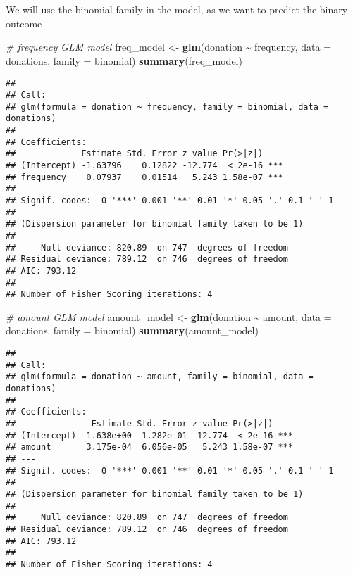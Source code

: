 \documentclass[
]{article}
\newenvironment{Shaded}{\begin{snugshade}}{\end{snugshade}}
\newcommand{\AttributeTok}[1]{\textcolor[rgb]{0.13,0.29,0.53}{#1}}
\newcommand{\CommentTok}[1]{\textcolor[rgb]{0.56,0.35,0.01}{\textit{#1}}}
\newcommand{\FunctionTok}[1]{\textcolor[rgb]{0.13,0.29,0.53}{\textbf{#1}}}
\newcommand{\NormalTok}[1]{#1}
\newcommand{\OtherTok}[1]{\textcolor[rgb]{0.56,0.35,0.01}{#1}}
\newcommand{\SpecialCharTok}[1]{\textcolor[rgb]{0.81,0.36,0.00}{\textbf{#1}}}
\begin{document}
We will use the binomial family in the model, as we want to predict the
binary outcome

\begin{Shaded}
\begin{Highlighting}[]
\CommentTok{\# frequency GLM model}
\NormalTok{freq\_model }\OtherTok{\textless{}{-}} \FunctionTok{glm}\NormalTok{(donation }\SpecialCharTok{\textasciitilde{}}\NormalTok{ frequency, }\AttributeTok{data =}\NormalTok{ donations, }\AttributeTok{family =}\NormalTok{ binomial)}
\FunctionTok{summary}\NormalTok{(freq\_model)}
\end{Highlighting}
\end{Shaded}

\begin{verbatim}
## 
## Call:
## glm(formula = donation ~ frequency, family = binomial, data = donations)
## 
## Coefficients:
##             Estimate Std. Error z value Pr(>|z|)    
## (Intercept) -1.63796    0.12822 -12.774  < 2e-16 ***
## frequency    0.07937    0.01514   5.243 1.58e-07 ***
## ---
## Signif. codes:  0 '***' 0.001 '**' 0.01 '*' 0.05 '.' 0.1 ' ' 1
## 
## (Dispersion parameter for binomial family taken to be 1)
## 
##     Null deviance: 820.89  on 747  degrees of freedom
## Residual deviance: 789.12  on 746  degrees of freedom
## AIC: 793.12
## 
## Number of Fisher Scoring iterations: 4
\end{verbatim}

\begin{Shaded}
\begin{Highlighting}[]
\CommentTok{\# amount GLM model}
\NormalTok{amount\_model }\OtherTok{\textless{}{-}} \FunctionTok{glm}\NormalTok{(donation }\SpecialCharTok{\textasciitilde{}}\NormalTok{ amount, }\AttributeTok{data =}\NormalTok{ donations, }\AttributeTok{family =}\NormalTok{ binomial)}
\FunctionTok{summary}\NormalTok{(amount\_model)}
\end{Highlighting}
\end{Shaded}

\begin{verbatim}
## 
## Call:
## glm(formula = donation ~ amount, family = binomial, data = donations)
## 
## Coefficients:
##               Estimate Std. Error z value Pr(>|z|)    
## (Intercept) -1.638e+00  1.282e-01 -12.774  < 2e-16 ***
## amount       3.175e-04  6.056e-05   5.243 1.58e-07 ***
## ---
## Signif. codes:  0 '***' 0.001 '**' 0.01 '*' 0.05 '.' 0.1 ' ' 1
## 
## (Dispersion parameter for binomial family taken to be 1)
## 
##     Null deviance: 820.89  on 747  degrees of freedom
## Residual deviance: 789.12  on 746  degrees of freedom
## AIC: 793.12
## 
## Number of Fisher Scoring iterations: 4
\end{verbatim}
\end{document}

